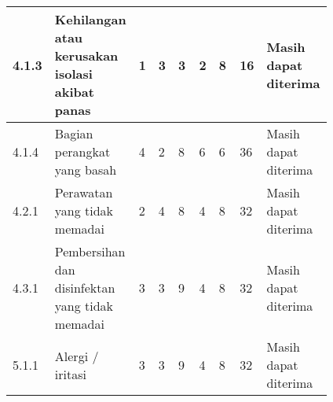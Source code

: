 \documentclass[11pt,a4paper,twoside,onecolumn]{book}
\begin{document}
\begin{longtable}{p{0.04\linewidth} p{0.12\linewidth} p{0.05\linewidth} p{0.05\linewidth} p{0.10\linewidth} p{0.05\linewidth} p{0.10\linewidth} p{0.07\linewidth} p{0.23\linewidth}}
		4.1.3 & Kehilangan atau kerusakan isolasi akibat panas &1 &3 &3 &2 &8 &16 & \cellcolor{green} Masih dapat diterima\\ \hline
		4.1.4 & Bagian perangkat yang basah &4 &2 &8 &6 &6 &36 & \cellcolor{yellow} Masih dapat diterima\\ \hline	
		4.2.1 & Perawatan yang tidak memadai &2 &4 &8 &4 &8 &32 & \cellcolor{yellow} Masih dapat diterima\\ \hline	
		4.3.1 & Pembersihan dan disinfektan yang tidak memadai &3 &3 &9 &4 &8 &32 & \cellcolor{yellow} Masih dapat diterima\\ \hline	
		5.1.1 & Alergi / iritasi&3 &3 &9 &4 &8 &32 & \cellcolor{yellow} Masih dapat diterima\\ \hline	    	    	  
		 \bottomrule	  
		
		\end{longtable}
		
	\newpage
	
	
\end{document}
